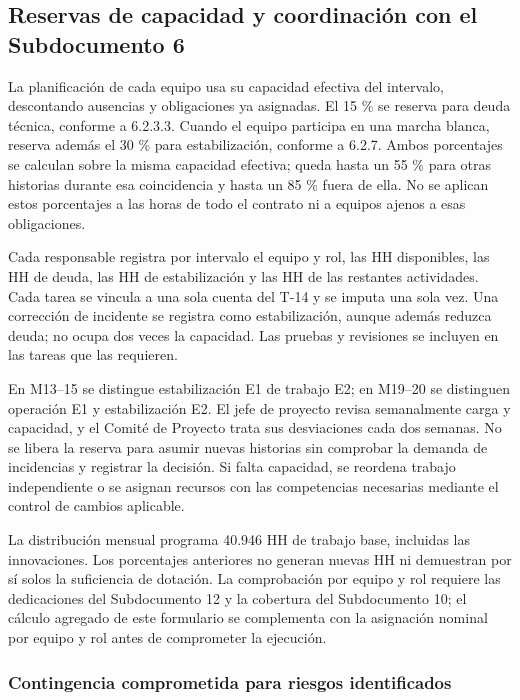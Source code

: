 \subsection{Reservas de capacidad y coordinación con el Subdocumento 6}

La planificación de cada equipo usa su capacidad efectiva del intervalo, descontando ausencias y obligaciones ya asignadas. El 15 \% se reserva para deuda técnica, conforme a 6.2.3.3. Cuando el equipo participa en una marcha blanca, reserva además el 30 \% para estabilización, conforme a 6.2.7. Ambos porcentajes se calculan sobre la misma capacidad efectiva; queda hasta un 55 \% para otras historias durante esa coincidencia y hasta un 85 \% fuera de ella. No se aplican estos porcentajes a las horas de todo el contrato ni a equipos ajenos a esas obligaciones.

Cada responsable registra por intervalo el equipo y rol, las HH disponibles, las HH de deuda, las HH de estabilización y las HH de las restantes actividades. Cada tarea se vincula a una sola cuenta del T-14 y se imputa una sola vez. Una corrección de incidente se registra como estabilización, aunque además reduzca deuda; no ocupa dos veces la capacidad. Las pruebas y revisiones se incluyen en las tareas que las requieren.

En M13–15 se distingue estabilización E1 de trabajo E2; en M19–20 se distinguen operación E1 y estabilización E2. El jefe de proyecto revisa semanalmente carga y capacidad, y el Comité de Proyecto trata sus desviaciones cada dos semanas. No se libera la reserva para asumir nuevas historias sin comprobar la demanda de incidencias y registrar la decisión. Si falta capacidad, se reordena trabajo independiente o se asignan recursos con las competencias necesarias mediante el control de cambios aplicable.

La distribución mensual programa 40.946 HH de trabajo base, incluidas las innovaciones. Los porcentajes anteriores no generan nuevas HH ni demuestran por sí solos la suficiencia de dotación. La comprobación por equipo y rol requiere las dedicaciones del Subdocumento 12 y la cobertura del Subdocumento 10; el cálculo agregado de este formulario se complementa con la asignación nominal por equipo y rol antes de comprometer la ejecución.

\subsubsection{Contingencia comprometida para riesgos identificados}

